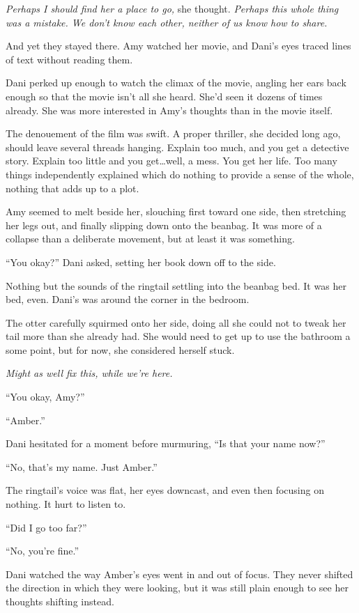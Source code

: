 \emph{Perhaps I should find her a place to go,} she thought. \emph{Perhaps this whole thing was a mistake. We don't know each other, neither of us know how to share.}

And yet they stayed there. Amy watched her movie, and Dani's eyes traced lines of text without reading them.

Dani perked up enough to watch the climax of the movie, angling her ears back enough so that the movie isn't all she heard. She'd seen it dozens of times already. She was more interested in Amy's thoughts than in the movie itself.\newpage

The denouement of the film was swift. A proper thriller, she decided long ago, should leave several threads hanging. Explain too much, and you get a detective story. Explain too little and you get\ldots{}well, a mess. You get her life. Too many things independently explained which do nothing to provide a sense of the whole, nothing that adds up to a plot.

Amy seemed to melt beside her, slouching first toward one side, then stretching her legs out, and finally slipping down onto the beanbag. It was more of a collapse than a deliberate movement, but at least it was something.

``You okay?'' Dani asked, setting her book down off to the side.

Nothing but the sounds of the ringtail settling into the beanbag bed. It was her bed, even. Dani's was around the corner in the bedroom.

The otter carefully squirmed onto her side, doing all she could not to tweak her tail more than she already had. She would need to get up to use the bathroom a some point, but for now, she considered herself stuck.

\emph{Might as well fix this, while we're here.}

``You okay, Amy?''

``Amber.''

Dani hesitated for a moment before murmuring, ``Is that your name now?''

``No, that's my name. Just Amber.''

The ringtail's voice was flat, her eyes downcast, and even then focusing on nothing. It hurt to listen to.

``Did I go too far?''

``No, you're fine.''

Dani watched the way Amber's eyes went in and out of focus. They never shifted the direction in which they were looking, but it was still plain enough to see her thoughts shifting instead.

